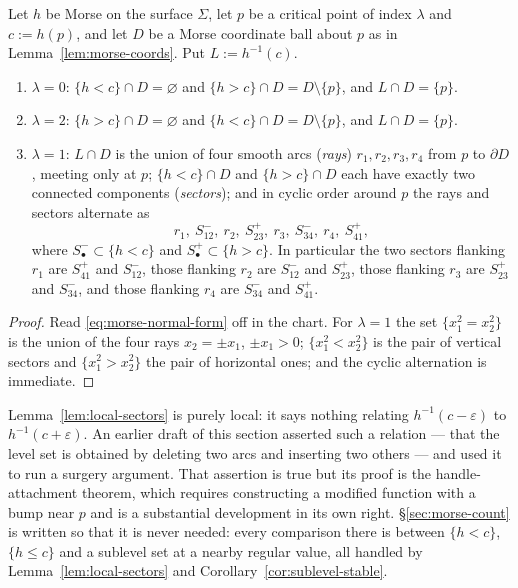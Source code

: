\begin{lemma}\label{lem:local-sectors}
Let $h$ be Morse on the surface $\Sigma$, let $p$ be a critical point of index
$\lambda$ and $c:=h(p)$, and let $D$ be a Morse coordinate ball about $p$ as
in Lemma~\ref{lem:morse-coords}.  Put $L:=h^{-1}(c)$.
\begin{enumerate}[label=(\roman*)]
\item\label{it:sect-0} $\lambda=0$: $\{h<c\}\cap D=\varnothing$ and
  $\{h>c\}\cap D=D\setminus\{p\}$, and $L\cap D=\{p\}$.
\item\label{it:sect-2} $\lambda=2$: $\{h>c\}\cap D=\varnothing$ and
  $\{h<c\}\cap D=D\setminus\{p\}$, and $L\cap D=\{p\}$.
\item\label{it:sect-1} $\lambda=1$: $L\cap D$ is the union of four smooth arcs
  (\emph{rays}) $r_1,r_2,r_3,r_4$ from $p$ to $\partial D$, meeting only at
  $p$; $\{h<c\}\cap D$ and $\{h>c\}\cap D$ each have exactly two connected
  components (\emph{sectors}); and in cyclic order around $p$ the rays and
  sectors alternate as
  \[
    r_1,\ S^-_{12},\ r_2,\ S^+_{23},\ r_3,\ S^-_{34},\ r_4,\ S^+_{41},
  \]
  where $S^-_{\bullet}\subset\{h<c\}$ and $S^+_{\bullet}\subset\{h>c\}$.  In
  particular the two sectors flanking $r_1$ are $S^+_{41}$ and $S^-_{12}$,
  those flanking $r_2$ are $S^-_{12}$ and $S^+_{23}$, those flanking $r_3$ are
  $S^+_{23}$ and $S^-_{34}$, and those flanking $r_4$ are $S^-_{34}$ and
  $S^+_{41}$.
\end{enumerate}
\end{lemma}

\begin{proof}
Read \eqref{eq:morse-normal-form} off in the chart.  For $\lambda=1$ the set
$\{x_1^2=x_2^2\}$ is the union of the four rays
$x_2=\pm x_1$, $\pm x_1>0$; $\{x_1^2<x_2^2\}$ is the pair of vertical sectors
and $\{x_1^2>x_2^2\}$ the pair of horizontal ones; and the cyclic alternation
is immediate.
\end{proof}

\begin{fnote}\label{fnote:no-handles}
Lemma~\ref{lem:local-sectors} is purely local: it says nothing relating
$h^{-1}(c-\varepsilon)$ to $h^{-1}(c+\varepsilon)$.  An earlier draft of this
section asserted such a relation --- that the level set is obtained by deleting
two arcs and inserting two others --- and used it to run a surgery argument.
That assertion is true but its proof is the handle-attachment theorem, which
requires constructing a modified function with a bump near $p$ and is a
substantial development in its own right.  \S\ref{sec:morse-count} is written
so that it is never needed: every comparison there is between $\{h<c\}$,
$\{h\le c\}$ and a sublevel set at a nearby regular value, all handled by
Lemma~\ref{lem:local-sectors} and
Corollary~\ref{cor:sublevel-stable}.
\end{fnote}

